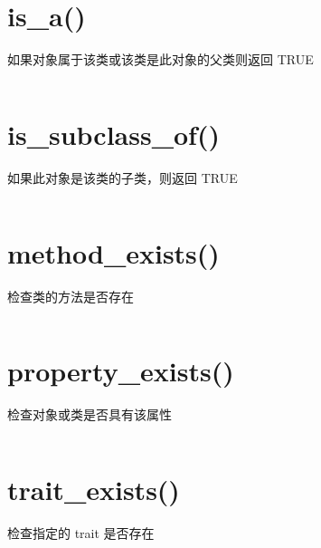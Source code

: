 \section{is\_a()}

如果对象属于该类或该类是此对象的父类则返回 TRUE


\begin{lstlisting}[language=PHP]

\end{lstlisting}


\section{is\_subclass\_of()}

如果此对象是该类的子类，则返回 TRUE


\begin{lstlisting}[language=PHP]

\end{lstlisting}


\section{method\_exists()}

检查类的方法是否存在


\begin{lstlisting}[language=PHP]

\end{lstlisting}


\section{property\_exists()}

检查对象或类是否具有该属性


\begin{lstlisting}[language=PHP]

\end{lstlisting}


\section{trait\_exists()}

检查指定的 trait 是否存在


\begin{lstlisting}[language=PHP]

\end{lstlisting}

